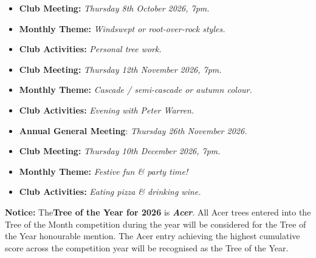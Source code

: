 \begin{itemize}
    \item \textbf{Club Meeting:} \textit{Thursday 8th October 2026, 7pm.}
    \item \textbf{Monthly Theme:} \textit{Windswept or root\--over\--rock styles.}
    \item \textbf{Club Activities:} \textit{Personal tree work.}
\end{itemize}

\begin{itemize}
    \item \textbf{Club Meeting:} \textit{Thursday 12th November 2026, 7pm.}
    \item \textbf{Monthly Theme:} \textit{Cascade / semi\--cascade or autumn colour.}
    \item \textbf{Club Activities:} \textit{Evening with Peter Warren.}
    \item \textbf{Annual General Meeting}: \textit{Thursday 26th November 2026.}
\end{itemize}

\begin{itemize}
    \item \textbf{Club Meeting:} \textit{Thursday 10th December 2026, 7pm.}
    \item \textbf{Monthly Theme:} \textit{Festive fun \& party time!}
    \item \textbf{Club Activities:} \textit{Eating pizza \& drinking wine.}
\end{itemize}

\noindent \textbf{Notice:} The\textbf{Tree of the Year for 2026} is \textbf{\textit{Acer}}. 
All Acer trees entered into the Tree of the Month competition during the year will be considered for the Tree of the Year honourable mention. 
The Acer entry achieving the highest cumulative score across the competition year will be recognised as the Tree of the Year.

\closearticle

